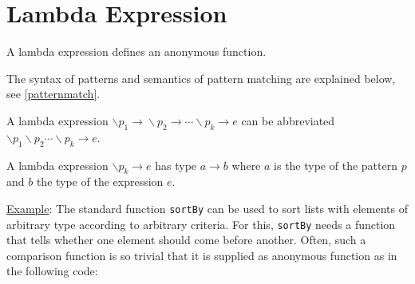 \section{Lambda Expression} \label{lambda}

A lambda expression defines an anonymous function.

\begin{flushleft}
 \sym{$\backslash$}  
  \alt \sym{$\backslash$}  \sym{->} 
\end{flushleft}

The syntax of patterns and semantics of pattern matching are explained below, see \autoref{patternmatch}.

A lambda expression $\backslash{}p_1\rightarrow{}\backslash{}p_2 \rightarrow{}\cdots{}\backslash{}p_k \rightarrow{} e$ can be abbreviated\\ $\backslash{}p_1 \backslash{}p_2 \cdots{} \backslash{}p_k \rightarrow{} e$.

A lambda expression $\backslash{}p_k \rightarrow{} e$ has type $a \rightarrow{} b$ where $a$ is the type of the pattern $p$ and $b$ the type of the expression $e$.


\underline{Example}: The standard function \texttt{sortBy} can be used to sort lists with elements of arbitrary type according to arbitrary criteria. For this, \texttt{sortBy} needs a function that tells whether one element should come before another. Often, such a comparison function is so trivial that it is supplied as anonymous function as in the following code:



